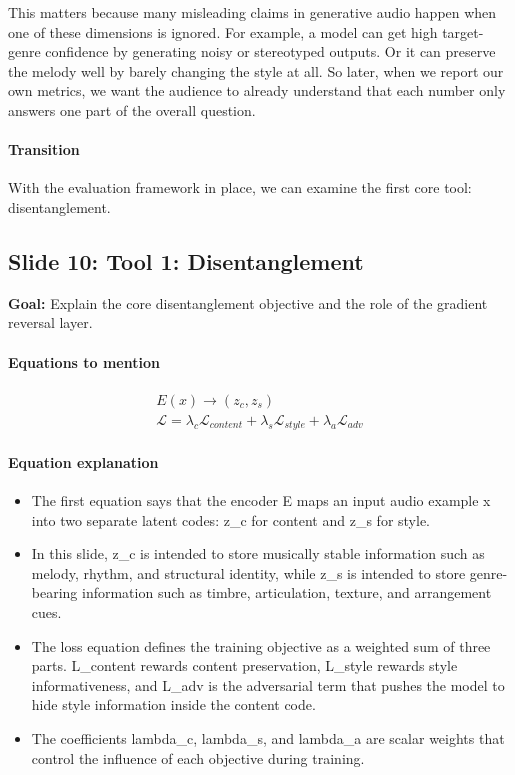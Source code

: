 \documentclass[11pt]{article}
\begin{document}
This matters because many misleading claims in generative audio happen when one of these dimensions is ignored. For example, a model can get high target-genre confidence by generating noisy or stereotyped outputs. Or it can preserve the melody well by barely changing the style at all. So later, when we report our own metrics, we want the audience to already understand that each number only answers one part of the overall question.

\paragraph{Transition}
With the evaluation framework in place, we can examine the first core tool: disentanglement.

\subsection*{Slide 10: Tool 1: Disentanglement}
\textbf{Goal:} Explain the core disentanglement objective and the role of the gradient reversal layer.
\paragraph{Equations to mention}
\begin{align*}
E(x)\rightarrow (z_c,z_s)\\
\mathcal{L}=\lambda_c \mathcal{L}_{content}+\lambda_s \mathcal{L}_{style}+\lambda_a \mathcal{L}_{adv}
\end{align*}
\paragraph{Equation explanation}
\begin{itemize}
\item The first equation says that the encoder E maps an input audio example x into two separate latent codes: z\_c for content and z\_s for style.
\item In this slide, z\_c is intended to store musically stable information such as melody, rhythm, and structural identity, while z\_s is intended to store genre-bearing information such as timbre, articulation, texture, and arrangement cues.
\item The loss equation defines the training objective as a weighted sum of three parts. L\_content rewards content preservation, L\_style rewards style informativeness, and L\_adv is the adversarial term that pushes the model to hide style information inside the content code.
\item The coefficients lambda\_c, lambda\_s, and lambda\_a are scalar weights that control the influence of each objective during training.
\end{itemize}
\end{document}
